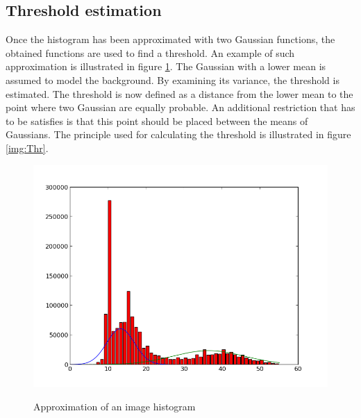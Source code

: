 
\subsection{Threshold estimation}

Once the histogram has been approximated with two Gaussian functions, the obtained functions are used to find a threshold. An example of such approximation is illustrated in figure \ref{img:Approx}. The Gaussian with a lower mean is assumed to model the background. By examining its variance, the threshold is estimated. The threshold is now defined as a distance from the lower mean to the point where two Gaussian are equally probable. An additional restriction that has to be satisfies is that this point should be placed between the means of Gaussians. The principle used for calculating the threshold is illustrated in figure \ref{img:Thr}. \\

\begin{figure}
	\begin{center}
		\includegraphics[scale=0.4]{Figures/segmentation/temp_hist_prez}
		\label{img:Approx}
		\caption{Approximation of an image histogram}
	\end{center}
\end{figure}

